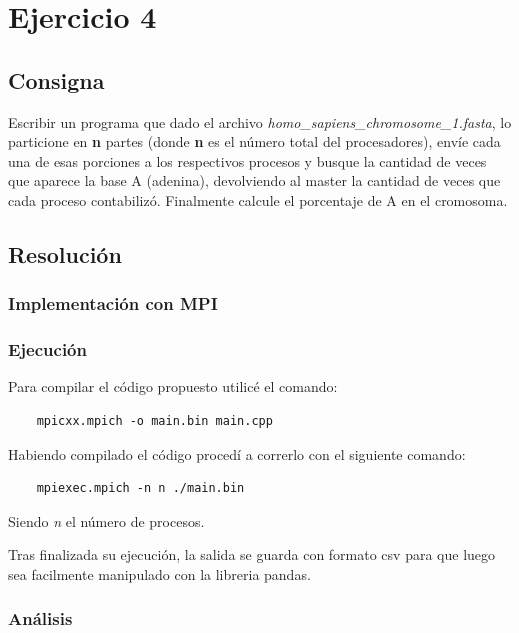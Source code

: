 \graphicspath{{Images/}}

\section{Ejercicio 4}

\subsection{Consigna}

Escribir un programa que dado el archivo \emph{homo\_sapiens\_chromosome\_1.fasta}, lo particione en \textbf{n} partes (donde \textbf{n} es el número total del procesadores), envíe cada una de esas porciones a los respectivos procesos y busque la cantidad de veces que aparece la base A (adenina), devolviendo al master la cantidad de veces que cada proceso contabilizó. Finalmente calcule el porcentaje de A en el cromosoma.

\subsection{Resolución}
\subsubsection{Implementación con MPI}




\subsubsection{Ejecución}
Para compilar el código propuesto utilicé el comando:
\begin{lstlisting}
    mpicxx.mpich -o main.bin main.cpp
\end{lstlisting}

Habiendo compilado el código procedí a correrlo con el siguiente comando:

\begin{lstlisting}
    mpiexec.mpich -n n ./main.bin
\end{lstlisting}

\hspace{5mm} Siendo \textit{n} el número de procesos.

Tras finalizada su ejecución, la salida se guarda con formato csv para que luego sea facilmente manipulado con la libreria pandas.

\subsubsection{Análisis}

